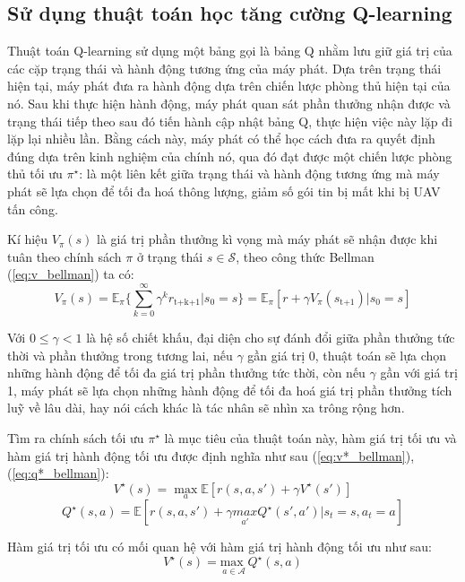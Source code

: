 \documentclass{uetgraduation}
\begin{document}
\subsection{Sử dụng thuật toán học tăng cường Q-learning}
Thuật toán Q-learning sử dụng một bảng gọi là bảng Q nhằm lưu giữ giá trị của các cặp trạng thái và hành động tương ứng của máy phát. Dựa trên trạng thái hiện tại, máy phát đưa ra hành động dựa trên
chiến lược phòng thủ hiện tại của nó. Sau khi thực hiện hành động, máy phát quan sát phần thưởng nhận được và trạng thái tiếp theo sau đó tiến hành cập nhật bảng Q, thực hiện việc này lặp đi lặp lại nhiều lần. 
Bằng cách này, máy phát có thể học cách đưa ra quyết định đúng dựa trên kinh nghiệm của chính nó, qua đó đạt được một chiến lược phòng thủ tối ưu $\pi^\star$: là một liên kết giữa trạng thái và hành động tương
ứng mà máy phát sẽ lựa chọn để tối đa hoá thông lượng, giảm số gói tin bị mất khi bị UAV tấn công.

Kí hiệu $V_\pi (s)$ là giá trị phần thưởng kì vọng mà máy phát sẽ nhận được khi tuân theo chính sách $\pi$ ở trạng thái $s \in \mathcal{S}$, theo công thức Bellman (\ref{eq:v_bellman}) ta có:
\begin{equation}
    V_\pi (s) = \mathbb{E}_\pi \{\sum_{k=0}^{\infty} \gamma^k r_\text{t+k+1} | s_0 = s\} = \mathbb{E}_\pi [r + \gamma V_\pi (s_\text{t+1}) | s_0 = s]
\end{equation}

Với $0 \leq \gamma < 1$ là hệ số chiết khấu, đại diện cho sự đánh đổi giữa phần thưởng tức thời và phần thưởng trong tương lai, nếu $\gamma$ gần giá trị 0, thuật toán sẽ lựa chọn những hành động để
tối đa giá trị phần thưởng tức thời, còn nếu $\gamma$ gần với giá trị 1, máy phát sẽ lựa chọn những hành động để tối đa hoá giá trị phần thưởng tích luỹ về lâu dài, hay nói cách khác là tác nhân sẽ nhìn xa
trông rộng hơn.

Tìm ra chính sách tối ưu $\pi^\star$ là mục tiêu của thuật toán này, hàm giá trị tối ưu và hàm giá trị hành động tối ưu được định nghĩa như sau (\ref{eq:v*_bellman}), (\ref{eq:q*_bellman}):
\begin{equation}
    V^\star (s) = \underset{a}{\max} \mathbb{E} [r(s, a, s') + \gamma V^\star (s')]
\end{equation}
\begin{equation}
    Q^\star (s, a) = \mathbb{E} [r(s, a, s') + \gamma \underset{a'}{ max } Q^\star (s', a') | s_t = s, a_t = a]
\end{equation}

Hàm giá trị tối ưu có mối quan hệ với hàm giá trị hành động tối ưu như sau:
\begin{equation}
    V^\star (s) = \underset{a \in \mathcal{A}}{\text{max }} Q^\star (s, a)
\end{equation}
\end{document}
